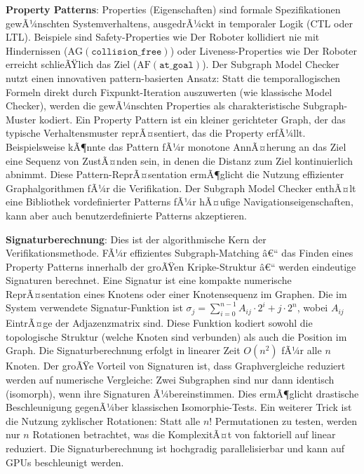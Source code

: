﻿\documentclass[a4paper,12pt]{article}
\theoremstyle{definition}
\begin{document}
\textbf{Property Patterns}: Properties (Eigenschaften) sind formale Spezifikationen gewÃ¼n\-schten Systemverhaltens, ausgedrÃ¼ckt in temporaler Logik (CTL oder LTL). Beispiele sind Safety-Properties wie Der Roboter kollidiert nie mit Hindernissen ($\text{AG}(\texttt{collision\_free})$) oder Liveness-Properties wie Der Roboter erreicht schlieÃŸlich das Ziel ($\text{AF}(\texttt{at\_goal})$). Der Subgraph Model Checker nutzt einen innovativen pattern-basierten Ansatz: Statt die temporallogischen Formeln direkt durch Fixpunkt-Iteration auszuwerten (wie klassische Model Checker), werden die gewÃ¼nschten Properties als charakteristische Subgraph-Muster kodiert. Ein Property Pattern ist ein kleiner gerichteter Graph, der das typische Verhaltensmuster reprÃ¤sentiert, das die Property erfÃ¼llt. Beispielsweise kÃ¶nnte das Pattern fÃ¼r monotone AnnÃ¤herung an das Ziel eine Sequenz von ZustÃ¤nden sein, in denen die Distanz zum Ziel kontinuierlich abnimmt. Diese Pattern-ReprÃ¤sentation ermÃ¶glicht die Nutzung effizienter Graphalgorithmen fÃ¼r die Verifikation. Der Subgraph Model Checker enthÃ¤lt eine Bibliothek vordefinierter Patterns fÃ¼r hÃ¤ufige Navigationseigenschaften, kann aber auch benutzerdefinierte Patterns akzeptieren.

\textbf{Signaturberechnung}: Dies ist der algorithmische Kern der Verifikationsmethode. FÃ¼r effizientes Subgraph-Matching â€“ das Finden eines Property Patterns innerhalb der groÃŸen Kripke-Struktur â€“ werden eindeutige Signaturen berechnet. Eine Signatur ist eine kompakte numerische ReprÃ¤sentation eines Knotens oder einer Knotensequenz im Graphen. Die im System verwendete Signatur-Funktion ist $\sigma_j = \sum_{i=0}^{n-1} A_{ij} \cdot 2^i + j \cdot 2^n$, wobei $A_{ij}$ EintrÃ¤ge der Adjazenzmatrix sind. Diese Funktion kodiert sowohl die topologische Struktur (welche Knoten sind verbunden) als auch die Position im Graph. Die Signaturberechnung erfolgt in linearer Zeit $O(n^2)$ fÃ¼r alle $n$ Knoten. Der groÃŸe Vorteil von Signaturen ist, dass Graphvergleiche reduziert werden auf numerische Vergleiche: Zwei Subgraphen sind nur dann identisch (isomorph), wenn ihre Signaturen Ã¼bereinstimmen. Dies ermÃ¶glicht drastische Beschleunigung gegenÃ¼ber klassischen Isomorphie-Tests. Ein weiterer Trick ist die Nutzung zyklischer Rotationen: Statt alle $n!$ Permutationen zu testen, werden nur $n$ Rotationen betrachtet, was die KomplexitÃ¤t von faktoriell auf linear reduziert. Die Signaturberechnung ist hochgradig parallelisierbar und kann auf GPUs beschleunigt werden.
\end{document}

